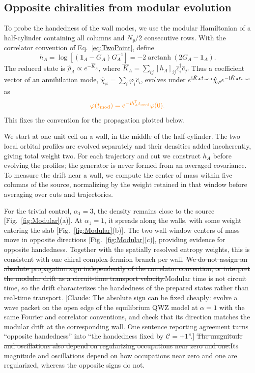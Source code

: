 \documentclass[aps,prb,10pt,twocolumn,superscriptaddress,longbibliography,floatfix]{revtex4-2}
\DeclareMathOperator\arctanh{arctanh}
\newcommand{\ii}{\mathrm{i}}
\newcommand{\mc}[1]{\mathcal{#1}}
\newcommand{\Id}{\mathbf{1}}
\newcommand{\claudeadd}[1]{{\color{orange}#1}}
\newcommand{\claudecom}[1]{{\color{ForestGreen}[Claude: #1]}}
\newcommand{\claudedel}[1]{{\color{orange}\sout{#1}}}
\begin{document}
{\color{blue}
\subsection{Opposite chiralities from modular evolution}
\label{sec:ModularEvolution}

To probe the handedness of the wall modes, we use the modular Hamiltonian of a half-cylinder containing all columns and $N_y/2$ consecutive rows. With the correlator convention of Eq.~\eqref{eq:TwoPoint}, define
\begin{equation}
 h_A=\log[(\Id_A-G_A)G_A^{-1}]=-2\arctanh(2G_A-\Id_A).
 \label{eq:ModularHamiltonian}
\end{equation}
The reduced state is $\hat\rho_A\propto e^{-\hat K_A}$, where \claudeadd{$\hat K_A=\sum_{ij}[h_A]_{ij}\hat c_i^\dagger\hat c_j$.} Thus a coefficient vector of an annihilation mode, $\hat\chi_\varphi=\sum_i\varphi_i\hat c_i$, evolves under $e^{\ii\hat K_A t_{\rm mod}}\hat\chi_\varphi e^{-\ii\hat K_A t_{\rm mod}}$ as
\begin{equation}
 \claudeadd{\varphi(t_{\rm mod})=e^{-\ii h_A^{\mathsf T} t_{\rm mod}}\varphi(0).}
 \label{eq:ModularEvolution}
\end{equation}
This fixes the convention for the propagation plotted below.

We start at one unit cell on a wall, in the middle of the half-cylinder. The two local orbital profiles are evolved separately and their densities added incoherently, giving total weight two. For each trajectory and cut we construct $h_A$ before evolving the profiles; the generator is never formed from an averaged covariance. To measure the drift near a wall, we compute the center of mass within five columns of the source, normalizing by the weight retained in that window before averaging over cuts and trajectories.

For the trivial control, $\alpha_1=3$, the density remains close to the source [Fig.~\ref{fig:Modular}(a)]. At $\alpha_1=1$, it spreads along the walls, with some weight entering the slab [Fig.~\ref{fig:Modular}(b)]. The two wall-window centers of mass move in opposite directions [Fig.~\ref{fig:Modular}(c)], providing evidence for opposite handedness. Together with the spatially resolved entropy weights, this is consistent with one chiral complex-fermion branch per wall. \claudedel{We do not assign an absolute propagation sign independently of the correlator convention, or interpret the modular drift as a circuit-time transport velocity.}\claudeadd{Modular time is not circuit time, so the drift characterizes the handedness of the prepared states rather than real-time transport.} \claudecom{The absolute sign can be fixed cheaply: evolve a wave packet on the open edge of the equilibrium QWZ model at $\alpha=1$ with the same Fourier and correlator conventions, and check that its direction matches the modular drift at the corresponding wall. One sentence reporting agreement turns ``opposite handedness'' into ``the handedness fixed by $\mc C=+1$''.} \claudedel{The magnitude and oscillations also depend on regularizing occupations near zero and one.}\claudeadd{Its magnitude and oscillations depend on how occupations near zero and one are regularized, whereas the opposite signs do not.}
}
\end{document}
